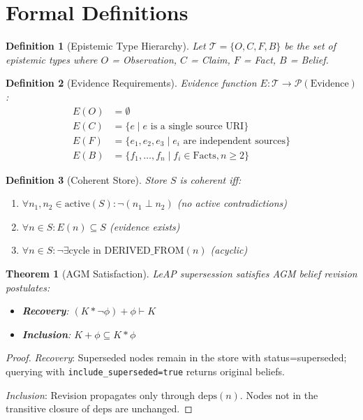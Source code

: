 \documentclass[11pt,letterpaper]{article}
\newtheorem{definition}{Definition}[section]
\newtheorem{theorem}{Theorem}[section]
\begin{document}
\section{Formal Definitions}
\label{app:formal}

\begin{definition}[Epistemic Type Hierarchy]
\label{def:types}
Let $\mathcal{T} = \{O, C, F, B\}$ be the set of epistemic types where $O$ = Observation, $C$ = Claim, $F$ = Fact, $B$ = Belief.
\end{definition}

\begin{definition}[Evidence Requirements]
\label{def:evidence}
Evidence function $E: \mathcal{T} \to \mathcal{P}(\text{Evidence})$:
\begin{align*}
E(O) &= \emptyset \\
E(C) &= \{e \mid e \text{ is a single source URI}\} \\
E(F) &= \{e_1, e_2, e_3 \mid e_i \text{ are independent sources}\} \\
E(B) &= \{f_1, \ldots, f_n \mid f_i \in \text{Facts}, n \geq 2\}
\end{align*}
\end{definition}

\begin{definition}[Coherent Store]
\label{def:coherent}
Store $S$ is coherent iff:
\begin{enumerate}[noitemsep]
    \item $\forall n_1, n_2 \in \text{active}(S): \neg(n_1 \perp n_2)$ (no active contradictions)
    \item $\forall n \in S: E(n) \subseteq S$ (evidence exists)
    \item $\forall n \in S: \neg\exists \text{cycle in DERIVED\_FROM}(n)$ (acyclic)
\end{enumerate}
\end{definition}

\begin{theorem}[AGM Satisfaction]
\label{thm:agm}
LeAP supersession satisfies AGM belief revision postulates:
\begin{itemize}[noitemsep]
    \item \textbf{Recovery}: $(K * \neg\phi) + \phi \vdash K$
    \item \textbf{Inclusion}: $K + \phi \subseteq K * \phi$
\end{itemize}
\end{theorem}

\begin{proof}
\textit{Recovery}: Superseded nodes remain in the store with status=superseded; querying with \texttt{include\_superseded=true} returns original beliefs.

\textit{Inclusion}: Revision propagates only through $\text{deps}(n)$. Nodes not in the transitive closure of $\text{deps}$ are unchanged.
\end{proof}
\end{document}
